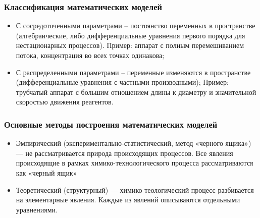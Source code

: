\begin{frame}
	\frametitle{Классификация математических моделей}
	\begin{itemize}
		\item С сосредоточенными параметрами – постоянство переменных в пространстве (алгебраические, либо дифференциальные уравнения первого порядка для нестационарных процессов). Пример: аппарат с полным перемешиванием потока, концентрация во всех точках одинакова;
		\item С распределенными параметрами – переменные изменяются в пространстве (дифференциальные уравнения с частными производными); Пример: трубчатый аппарат с большим отношением длины к диаметру и значительной скоростью движения реагентов.
	\end{itemize}
	
\end{frame}

\begin{frame}
	\frametitle{Основные методы построения математических моделей}
	\begin{itemize}
		\item Эмпирический (экспериментально-статистический, метод «черного ящика») --- не рассматривается природа происходящих процессов. Все явления происходящие в рамках химико-технологического процесса рассматриваются как «черный ящик»
		\item Теоретический (структурный) --- химико-теологический процесс разбивается на элементарные явления. Каждые из явлений описываются отдельными уравнениями.
	\end{itemize}
	
\end{frame}

